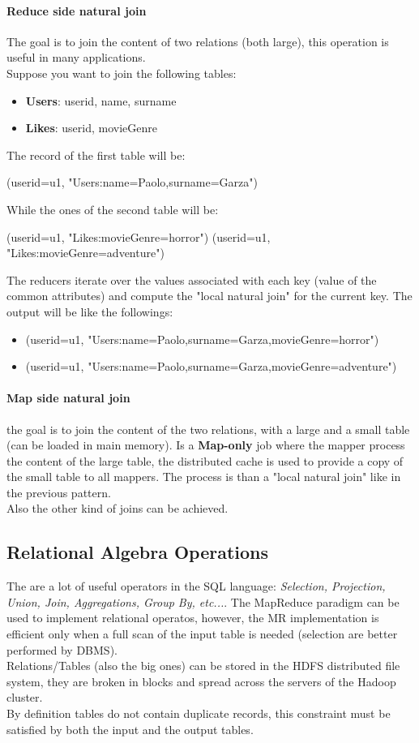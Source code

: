 \documentclass[12pt]{article}
\begin{document}
\paragraph{Reduce side natural join}
The goal is to join the content of two relations (both large), this operation is useful in many applications.\\
Suppose you want to join the following tables:
\begin{itemize}
  \item \textbf{Users}: userid, name, surname
  \item \textbf{Likes}: userid, movieGenre
\end{itemize}
The record of the first table will be:
\begin{center}
  (userid=u1, "Users:name=Paolo,surname=Garza")
\end{center}
While the ones of the second table will be:
\begin{center}
  (userid=u1, "Likes:movieGenre=horror")
  (userid=u1, "Likes:movieGenre=adventure")
\end{center}
The reducers iterate over the values associated with each key (value of the common attributes) and compute the "local natural join" for the current key. The output will be like the followings:
\begin{itemize}
  \item (userid=u1, "Users:name=Paolo,surname=Garza,movieGenre=horror")
  \item (userid=u1, "Users:name=Paolo,surname=Garza,movieGenre=adventure")
\end{itemize}

\paragraph{Map side natural join} the goal is to join the content of the two relations, with a large and a small table (can be loaded in main memory). Is a \textbf{Map-only} job where the mapper process the content of the large table, the distributed cache is used to provide a copy of the small table to all mappers. The process is than a "local natural join" like in the previous pattern.\\
Also the other kind of joins can be achieved.

\subsection{Relational Algebra Operations}
The are a lot of useful operators in the SQL language: \textit{Selection, Projection, Union, Join, Aggregations, Group By, etc...}. The MapReduce paradigm can be used to implement relational operatos, however, the MR implementation is efficient only when a full scan of the input table is needed (selection are better performed by DBMS).\\
Relations/Tables (also the big ones) can be stored in the HDFS distributed file system, they are broken in blocks and spread across the servers of the Hadoop cluster.\\
By definition tables do not contain duplicate records, this constraint must be satisfied by both the input and the output tables.
\end{document}
